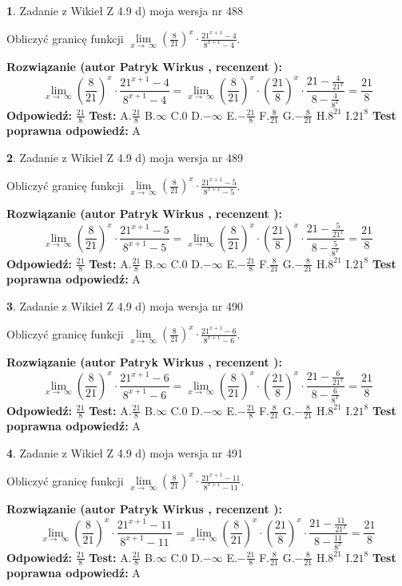 \documentclass[12pt, a4paper]{article}
\theoremstyle{definition} %
\newtheorem{zad}{}
\newcommand{\zadStart}[1]{\begin{zad}#1\newline}
\newcommand{\zadStop}{\end{zad}}
\newcommand{\rozwStart}[2]{\noindent \textbf{Rozwiązanie (autor #1 , recenzent #2): }\newline}
\newcommand{\rozwStop}{\newline}
\newcommand{\odpStart}{\noindent \textbf{Odpowiedź:}\newline}
\newcommand{\odpStop}{\newline}
\newcommand{\testStart}{\noindent \textbf{Test:}\newline}
\newcommand{\testStop}{\newline}
\newcommand{\kluczStart}{\noindent \textbf{Test poprawna odpowiedź:}\newline}
\newcommand{\kluczStop}{\newline}
\begin{document}
\zadStart{Zadanie z Wikieł Z 4.9 d) moja wersja nr 488}


Obliczyć granicę funkcji  $\lim\limits_{x\to\ \infty}(\frac{8}{21})^{x}\cdot\frac{21^{x+1}-4}{8^{x+1}-4}$.
\zadStop
\rozwStart{Patryk Wirkus}{}
$$\lim\limits_{x\to\ \infty}(\frac{8}{21})^{x}\cdot\frac{21^{x+1}-4}{8^{x+1}-4}=\lim\limits_{x\to\ \infty}(\frac{8}{21})^{x}\cdot(\frac{21}{8})^{x} \cdot \frac{21-\frac{4}{21^{x}}}{8-\frac{4}{8^{x}}} = \frac{21}{8}$$
\rozwStop
\odpStart
$\frac{21}{8}$
\odpStop
\testStart
A.$\frac{21}{8}$ B.$\infty$ C.$0$ D.$-\infty$ E.$-\frac{21}{8}$
F.$\frac{8}{21}$ G.$-\frac{8}{21}$
H.$8^{21}$
I.$21^{8}$
\testStop
\kluczStart
A
\kluczStop



\zadStart{Zadanie z Wikieł Z 4.9 d) moja wersja nr 489}


Obliczyć granicę funkcji  $\lim\limits_{x\to\ \infty}(\frac{8}{21})^{x}\cdot\frac{21^{x+1}-5}{8^{x+1}-5}$.
\zadStop
\rozwStart{Patryk Wirkus}{}
$$\lim\limits_{x\to\ \infty}(\frac{8}{21})^{x}\cdot\frac{21^{x+1}-5}{8^{x+1}-5}=\lim\limits_{x\to\ \infty}(\frac{8}{21})^{x}\cdot(\frac{21}{8})^{x} \cdot \frac{21-\frac{5}{21^{x}}}{8-\frac{5}{8^{x}}} = \frac{21}{8}$$
\rozwStop
\odpStart
$\frac{21}{8}$
\odpStop
\testStart
A.$\frac{21}{8}$ B.$\infty$ C.$0$ D.$-\infty$ E.$-\frac{21}{8}$
F.$\frac{8}{21}$ G.$-\frac{8}{21}$
H.$8^{21}$
I.$21^{8}$
\testStop
\kluczStart
A
\kluczStop



\zadStart{Zadanie z Wikieł Z 4.9 d) moja wersja nr 490}


Obliczyć granicę funkcji  $\lim\limits_{x\to\ \infty}(\frac{8}{21})^{x}\cdot\frac{21^{x+1}-6}{8^{x+1}-6}$.
\zadStop
\rozwStart{Patryk Wirkus}{}
$$\lim\limits_{x\to\ \infty}(\frac{8}{21})^{x}\cdot\frac{21^{x+1}-6}{8^{x+1}-6}=\lim\limits_{x\to\ \infty}(\frac{8}{21})^{x}\cdot(\frac{21}{8})^{x} \cdot \frac{21-\frac{6}{21^{x}}}{8-\frac{6}{8^{x}}} = \frac{21}{8}$$
\rozwStop
\odpStart
$\frac{21}{8}$
\odpStop
\testStart
A.$\frac{21}{8}$ B.$\infty$ C.$0$ D.$-\infty$ E.$-\frac{21}{8}$
F.$\frac{8}{21}$ G.$-\frac{8}{21}$
H.$8^{21}$
I.$21^{8}$
\testStop
\kluczStart
A
\kluczStop



\zadStart{Zadanie z Wikieł Z 4.9 d) moja wersja nr 491}


Obliczyć granicę funkcji  $\lim\limits_{x\to\ \infty}(\frac{8}{21})^{x}\cdot\frac{21^{x+1}-11}{8^{x+1}-11}$.
\zadStop
\rozwStart{Patryk Wirkus}{}
$$\lim\limits_{x\to\ \infty}(\frac{8}{21})^{x}\cdot\frac{21^{x+1}-11}{8^{x+1}-11}=\lim\limits_{x\to\ \infty}(\frac{8}{21})^{x}\cdot(\frac{21}{8})^{x} \cdot \frac{21-\frac{11}{21^{x}}}{8-\frac{11}{8^{x}}} = \frac{21}{8}$$
\rozwStop
\odpStart
$\frac{21}{8}$
\odpStop
\testStart
A.$\frac{21}{8}$ B.$\infty$ C.$0$ D.$-\infty$ E.$-\frac{21}{8}$
F.$\frac{8}{21}$ G.$-\frac{8}{21}$
H.$8^{21}$
I.$21^{8}$
\testStop
\kluczStart
A
\kluczStop
\end{document}

